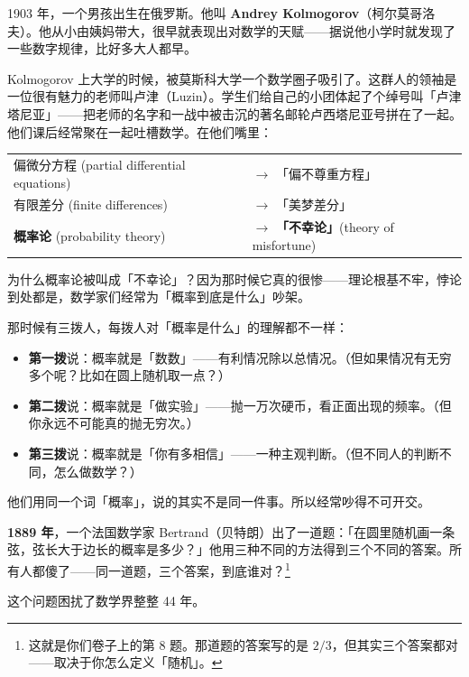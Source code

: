 \documentclass[12pt,a4paper]{article}
\begin{document}
\begin{storybox}
1903 年，一个男孩出生在俄罗斯。他叫 \textbf{Andrey Kolmogorov}（柯尔莫哥洛夫）。他从小由姨妈带大，很早就表现出对数学的天赋——据说他小学时就发现了一些数字规律，比好多大人都早。

Kolmogorov 上大学的时候，被莫斯科大学一个数学圈子吸引了。这群人的领袖是一位很有魅力的老师叫卢津（Luzin）。学生们给自己的小团体起了个绰号叫「卢津塔尼亚」——把老师的名字和一战中被击沉的著名邮轮卢西塔尼亚号拼在了一起。他们课后经常聚在一起吐槽数学。在他们嘴里：

\begin{center}
\renewcommand{\arraystretch}{1.3}
\begin{tabular}{ll}
偏微分方程 (partial differential equations) & $\rightarrow$ 「偏不尊重方程」\\
有限差分 (finite differences) & $\rightarrow$ 「美梦差分」\\
\textbf{概率论} (probability theory) & $\rightarrow$ \textbf{「不幸论」}(theory of misfortune)\\
\end{tabular}
\end{center}

为什么概率论被叫成「不幸论」？因为那时候它真的很惨——理论根基不牢，悖论到处都是，数学家们经常为「概率到底是什么」吵架。

那时候有三拨人，每拨人对「概率是什么」的理解都不一样：
\begin{itemize}[leftmargin=2em]
  \item \textbf{第一拨}说：概率就是「数数」——有利情况除以总情况。（但如果情况有无穷多个呢？比如在圆上随机取一点？）
  \item \textbf{第二拨}说：概率就是「做实验」——抛一万次硬币，看正面出现的频率。（但你永远不可能真的抛无穷次。）
  \item \textbf{第三拨}说：概率就是「你有多相信」——一种主观判断。（但不同人的判断不同，怎么做数学？）
\end{itemize}

他们用同一个词「概率」，说的其实不是同一件事。所以经常吵得不可开交。

\textbf{1889 年}，一个法国数学家 Bertrand（贝特朗）出了一道题：「在圆里随机画一条弦，弦长大于边长的概率是多少？」他用三种不同的方法得到三个不同的答案。所有人都傻了——同一道题，三个答案，到底谁对？\footnote{这就是你们卷子上的第 8 题。那道题的答案写的是 $2/3$，但其实三个答案都对——取决于你怎么定义「随机」。}

这个问题困扰了数学界整整 44 年。


\end{storybox}
\end{document}
